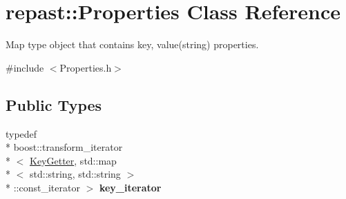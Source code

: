 \hypertarget{classrepast_1_1_properties}{\section{repast\-:\-:Properties Class Reference}
\label{classrepast_1_1_properties}
}


Map type object that contains key, value(string) properties.  




{\ttfamily \#include $<$Properties.\-h$>$}

\subsection*{Public Types}
\begin{DoxyCompactItemize}
\item 
\hypertarget{classrepast_1_1_properties_a033e3e16f3cfb8579fa09973ea3a53da}{typedef \\*
boost\-::transform\-\_\-iterator\\*
$<$ \hyperlink{structrepast_1_1_key_getter}{Key\-Getter}, std\-::map\\*
$<$ std\-::string, std\-::string $>$\\*
\-::const\-\_\-iterator $>$ {\bfseries key\-\_\-iterator}}\label{classrepast_1_1_properties_a033e3e16f3cfb8579fa09973ea3a53da}

\end{DoxyCompactItemize}
